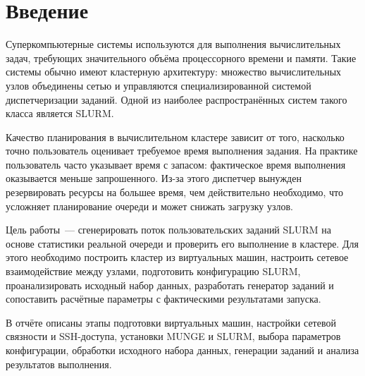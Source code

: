 \section*{Введение}

Суперкомпьютерные системы используются для выполнения вычислительных задач, требующих значительного объёма процессорного времени и памяти. Такие системы обычно имеют кластерную архитектуру: множество вычислительных узлов объединены сетью и управляются специализированной системой диспетчеризации заданий. Одной из наиболее распространённых систем такого класса является SLURM.

Качество планирования в вычислительном кластере зависит от того, насколько точно пользователь оценивает требуемое время выполнения задания. На практике пользователь часто указывает время с запасом: фактическое время выполнения оказывается меньше запрошенного. Из-за этого диспетчер вынужден резервировать ресурсы на большее время, чем действительно необходимо, что усложняет планирование очереди и может снижать загрузку узлов.

Цель работы~--- сгенерировать поток пользовательских заданий SLURM на основе статистики реальной очереди и проверить его выполнение в кластере. Для этого необходимо построить кластер из виртуальных машин, настроить сетевое взаимодействие между узлами, подготовить конфигурацию SLURM, проанализировать исходный набор данных, разработать генератор заданий и сопоставить расчётные параметры с фактическими результатами запуска.

В отчёте описаны этапы подготовки виртуальных машин, настройки сетевой связности и SSH-доступа, установки MUNGE и SLURM, выбора параметров конфигурации, обработки исходного набора данных, генерации заданий и анализа результатов выполнения.
